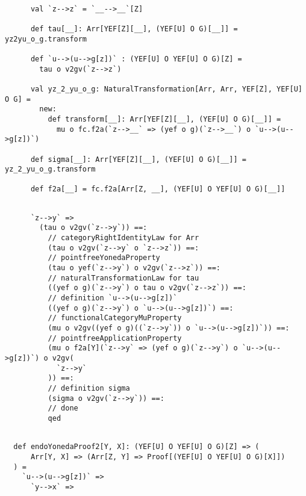 \documentclass[11pt]{article}
\begin{document}
\vspace{6pt}
\begin{mdframed}[backgroundcolor=lightgray!20] 
\begin{lstlisting}

      val `z-->z` = `__-->__`[Z]

      def tau[__]: Arr[YEF[Z][__], (YEF[U] O G)[__]] = yz2yu_o_g.transform

      def `u-->(u-->g[z])` : (YEF[U] O YEF[U] O G)[Z] =
        tau o v2gv(`z-->z`)

      val yz_2_yu_o_g: NaturalTransformation[Arr, Arr, YEF[Z], YEF[U] O G] =
        new:
          def transform[__]: Arr[YEF[Z][__], (YEF[U] O G)[__]] =
            mu o fc.f2a(`z-->__` => (yef o g)(`z-->__`) o `u-->(u-->g[z])`)

      def sigma[__]: Arr[YEF[Z][__], (YEF[U] O G)[__]] = yz_2_yu_o_g.transform

      def f2a[__] = fc.f2a[Arr[Z, __], (YEF[U] O YEF[U] O G)[__]]
\end{lstlisting}
\end{mdframed}
\vspace{6pt}
\clearpage
\begin{mdframed}[backgroundcolor=lightgray!20] 
\begin{lstlisting}

      `z-->y` =>
        (tau o v2gv(`z-->y`)) ==:
          // categoryRightIdentityLaw for Arr
          (tau o v2gv(`z-->y` o `z-->z`)) ==:
          // pointfreeYonedaProperty
          (tau o yef(`z-->y`) o v2gv(`z-->z`)) ==:
          // naturalTransformationLaw for tau
          ((yef o g)(`z-->y`) o tau o v2gv(`z-->z`)) ==:
          // definition `u-->(u-->g[z])`
          ((yef o g)(`z-->y`) o `u-->(u-->g[z])`) ==:
          // functionalCategoryMuProperty
          (mu o v2gv((yef o g)((`z-->y`)) o `u-->(u-->g[z])`)) ==:
          // pointfreeApplicationProperty
          (mu o f2a[Y](`z-->y` => (yef o g)(`z-->y`) o `u-->(u-->g[z])`) o v2gv(
            `z-->y`
          )) ==:
          // definition sigma
          (sigma o v2gv(`z-->y`)) ==:
          // done
          qed
\end{lstlisting}
\end{mdframed}
\vspace{6pt}
\begin{mdframed}[backgroundcolor=lightgray!20] 
\begin{lstlisting}

  def endoYonedaProof2[Y, X]: (YEF[U] O YEF[U] O G)[Z] => (
      Arr[Y, X] => (Arr[Z, Y] => Proof[(YEF[U] O YEF[U] O G)[X]])
  ) =
    `u-->(u-->g[z])` =>
      `y-->x` =>
\end{lstlisting}
\end{mdframed}
\end{document}
